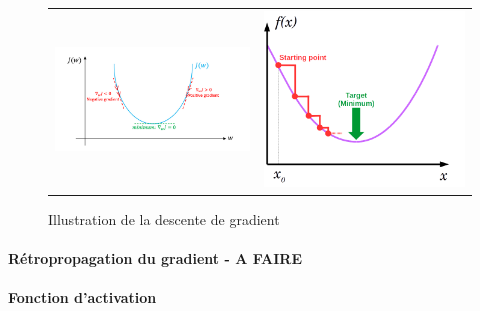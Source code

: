 \begin{figure}
    \centering
    \begin{tabular}{cc}
        \includegraphics[scale=0.35]{./tex/fondamentaux/graddes.png} &  \includegraphics[scale=0.3]{./tex/fondamentaux/graddes2.png}
    \end{tabular}
    \caption{Illustration de la descente de gradient}
    \label{graddes}
\end{figure}

\paragraph{Rétropropagation du gradient - A FAIRE}


\paragraph{Fonction d'activation}

